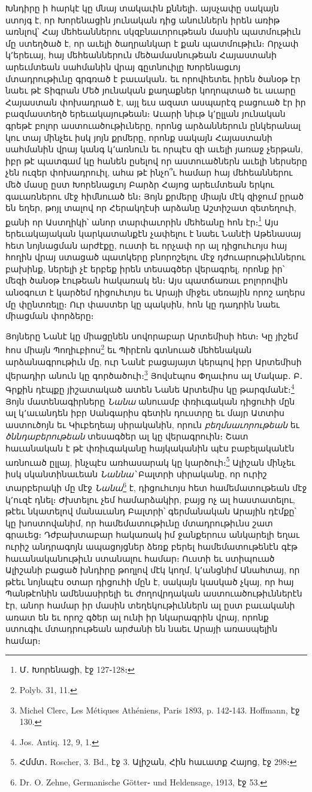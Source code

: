 \documentclass{article}
\begin{document}
{Խնդիրը ի հարկէ կը մնայ տակաւին քննելի․ այսչափը սակայն ստոյգ է, որ Խորենացին յունական դից անուններն իրեն առիթ առնլով՝ Հայ մեհեաններու սկզբնաւորութեան մասին պատմութիւն մը ստեղծած է, որ աւելի ծաղրանկար է քան պատմութիւն։ Որչափ կ՚երեւայ, հայ մեհեաններուն մեծամասնութեան Հայաստանի արեւմտեան սահմանին վրայ գըտնուիլը Խորենացւոյ մտադրութիւնը գրգռած է բաւական․ եւ որովհետեւ իրեն ծանօթ էր նաեւ թէ Տիգրան Մեծ յունական քաղաքներ կողոպտած եւ աւարը Հայաստան փոխադրած է, այլ եւս ազատ ասպարէզ բացուած էր իր բազմաստեղծ երեւակայութեան։ Աւարի նիւթ կ՚ըլլան յունական գրեթէ բոլոր աստուածութիւները, որոնց արձաններուն ընկերանալ կու տայ մինչեւ իսկ յոյն քրմերը, որոնք սակայն Հայաստանի սահմանին վրայ կանգ կ՚առնուն եւ որպէս զի աւելի յառաջ չերթան, իբր թէ պատգամ կը հանեն ըսելով որ աստուածներն աւելի ներսերը չեն ուզեր փոխադրուիլ, ահա թէ ինչո՞ւ համար հայ մեհեաններու մեծ մասը ըստ Խորենացւոյ Բարձր Հայոց արեւմտեան երկու գաւառներու մէջ հիմնուած են։ Յոյն քրմերը միայն մէկ զիջում ըրած են եղեր, թոյլ տալով որ Հերակղէսի արձանը Աշտիշատ զետեղուի, քանի որ Աստղիկի՝ անոր տարփաւորին մեհեանը հոն էր։\footnote{Մ․ Խորենացի, էջ 127֊128։} Այս երեւակայական կարկատանքէն չափելու է նաեւ Նանէի Աթենասայ հետ նոյնացման արժէքը, ուստի եւ որչափ որ ալ դիցուհւոյս հայ հողին վրայ ստացած պատկերը բնորոշելու մէջ դժուարութիւններու բախինք, ներելի չէ երբեք իրեն տեսագծեր վերագրել, որոնք իր՝ մեզի ծանօթ էութեան հակառակ են։ Այս պատճառաւ բոլորովին անօգուտ է կարծեմ դիցուհւոյս եւ Արայի միջեւ սեռային որոշ աղերս մը փընտռելը։ Ուր փաստեր կը պակսին, հոն կը դադրին նաեւ միացման փորձերը։

Յոյները Նանէ կը միացընեն սովորաբար Արտեմիսի հետ։ Կը յիշեմ հոս միայն Պողիւբիոս\footnote{Polyb. 31, 11.} եւ Պիրէոն գտնուած մեհենական արձանագրութիւն մը, ուր Նանէ բացայայտ կերպով իբր Արտեմիսի վերադիր անուն կը գործածուի։\footnote{Michel Clerc, Les Métiques Athéniens, Paris 1893, p. 142֊143. Hoffmann, էջ 130.} Յովսէպոս Փղաւիոս ալ Մակաբ․ Բ․ Գրքին դէպքը յիշատակած ատեն Նանե Արտեմիս կը թարգմանէ։\footnote{Jos. Antiq. 12, 9, 1.} Յոյն մատենագիրները \emph{Նանա} անուամբ փռիւգական դիցուհի մըն ալ կ՚աւանդեն իբր Սանգարիս գետին դուստրը եւ մայր Ատտիս աստուծոյն եւ Կիւբեղեայ սիրականին, որուն \emph{բեղմսաւորութեան} եւ \emph{ծննդաբերութեան} տեսագծեր ալ կը վերագրուին։ Շատ հաւանական է թէ փռիւգականը հայկականին պէս բաբելականէն առնուած ըլլայ, ինչպէս առհասարակ կը կարծուի։\footnote{Հմմտ․ Roscher, 3. Bd., էջ 3. Ալիշան, Հին հաւատք Հայոց, էջ 298։} Ալիշան մինչեւ իսկ սկանտինաւեան \emph{Նաննա՝} Բալտրի սիրականը, որ ուրիշ տարբերակի մը մէջ \emph{Նանա}\footnote{Dr. O. Zehne, Germanische Götter֊ und Heldensage, 1913, էջ 53.} է, դիցուհւոյս հետ համեմատութեան մէջ կ՚ուզէ դնել։ Ժխտելու չեմ համարձակիր, բայց ոչ ալ հաստատելու, թէեւ նկատելով մանաւանդ Բալտրի՝ գերմանական Արային դէմքը՝ կը խոստովանիմ, որ համեմատութիւնը մտադրութիւնս շատ գրաւեց։ Դժբախտաբար հակառակ իմ ջանքերուս անկարելի եղաւ ուրիշ անդրագոյն ապացոյցներ ձեռք բերել համեմատութենէն գէթ հաւանականութիւն ստանալու համար։ Ուստի եւ ստիպուած Ալիշանի բացած խնդիրը թողլով մէկ կողմ, կ՚անցնիմ Անահտայ, որ թէեւ նոյնպէս օտար դիցուհի մըն է, սակայն կասկած չկայ, որ հայ Պանթէոնին ամենասիրելի եւ ժողովրդական աստուածութիւններէն էր, անոր համար իր մասին տեղեկութիւններն ալ ըստ բաւականի առատ են եւ որոշ գծեր ալ ունի իր նկարագրին վրայ, որոնք ստուգիւ մտադրութեան արժանի են նաեւ Արայի առասպելին համար։

}
\end{document}
